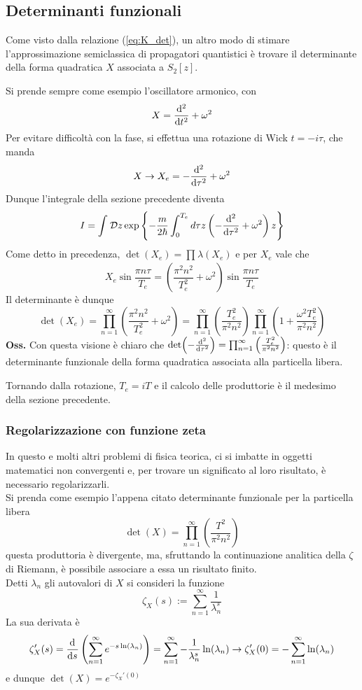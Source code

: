 \subsection{Determinanti funzionali}
Come visto dalla relazione (\ref{eq:K_det}), un altro modo di stimare l'approssimazione semiclassica
di propagatori quantistici è trovare il determinante della forma quadratica $X$ associata a $S_2[z]$.

Si prende sempre come esempio l'oscillatore armonico, con
$$X = \dv[2]{}{t}+\omega^2$$
Per evitare difficoltà con la fase, si effettua una rotazione di Wick $t=-i\tau$, che manda
$$X\to X_e = - \dv[2]{}{\tau} + \omega^2$$
Dunque l'integrale della sezione precedente diventa
$$I = \int_{}^{}\mathcal{D}z \exp\left\{-\frac{m}{2\hbar}\int_{0}^{T_e}d\tau z
\left(-\dv[2]{}{\tau}+\omega^2\right)z\right\}$$
Come detto in precedenza, $\det(X_e) = \prod_{}^{}\lambda(X_e)$ e per $X_e$ vale che
$$X_e \sin\frac{\pi n\tau}{T_e}=\left(\frac{\pi^2n^2}{T_e^2} +\omega^2\right) \sin\frac{\pi n\tau}{T_e}$$
Il determinante è dunque
$$\det(X_e) = \prod_{n=1}^{\infty}\left(\frac{\pi^2n^2}{T_e^2} + \omega^2\right) =
\prod_{n=1}^{\infty}\left(\frac{T^2_e}{\pi^2n^2}\right)\prod_{n=1}^{\infty}
\left(1+\frac{\omega^2T_e^2}{\pi^2n^2}\right)$$
\textbf{Oss.} Con questa visione è chiaro che $\det(-\dv[2]{}{\tau}) = \prod_{n=1}^{\infty}\left(
\frac{T^2_e}{\pi^2n^2}\right)$: questo è il determinante funzionale della forma quadratica associata
alla particella libera.

Tornando dalla rotazione, $T_e = iT$ e il calcolo delle produttorie è il medesimo della sezione
precedente.
\subsubsection{Regolarizzazione con funzione zeta}
In questo e molti altri problemi di fisica teorica, ci si imbatte in oggetti matematici non convergenti
e, per trovare un significato al loro risultato, è necessario regolarizzarli.\\
Si prenda come esempio l'appena citato determinante funzionale per la particella libera
$$\det(X) = \prod_{n=1}^{\infty}\left(\frac{T^2}{\pi^2n^2}\right)$$
questa produttoria è divergente, ma, sfruttando la continuazione analitica della $\zeta$ di Riemann,
è possibile associare a essa un risultato finito.\\
Detti $\lambda_n$ gli autovalori di $X$ si consideri la funzione
$$\zeta_X(s):=\sum_{n=1}^{\infty}\frac{1}{\lambda^s_{n}}$$
La sua derivata è
$$\zeta_X'(s) = \dv[]{}{s}\left(\sum_{n=1}^{\infty}e^{-s\ln(\lambda_n)}\right)=
\sum_{n=1}^{\infty}-\frac{1}{\lambda_n^s}\ln(\lambda_n) \rightarrow \zeta_X'(0) =
-\sum_{n=1}^{\infty}\ln(\lambda_n)$$
e dunque $\det(X) = e^{-\zeta_X'(0)}$

